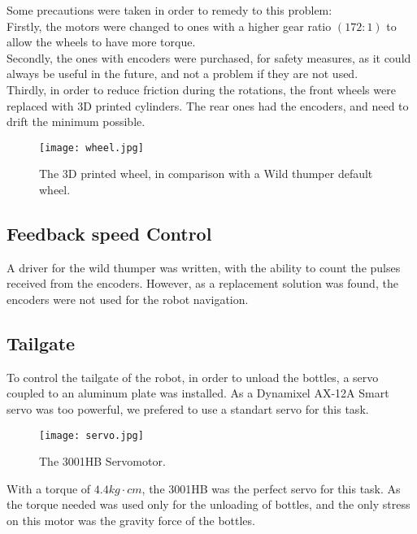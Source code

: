 Some precautions were taken in order to remedy to this problem:\\

Firstly, the motors were changed to ones with a higher gear ratio $(172:1)$ to allow the wheels to have more torque.\\

Secondly, the ones with encoders were purchased, for safety measures, as it could always be useful in the future, and not a problem if they are not used. \\

Thirdly, in order to reduce friction during the rotations, the front wheels were replaced with 3D printed cylinders. The rear ones had the encoders, and need to drift the minimum possible. \\

\begin{figure}[H]
  \centering
  \texttt{[image: wheel.jpg]}
  \caption{The 3D printed wheel, in comparison with a Wild thumper default wheel.}
\label{fig:wheel}
\end{figure}

\subsection{Feedback speed Control}
A driver for the wild thumper was written, with the ability to count the pulses received from the encoders. However, as a replacement solution was found, the encoders were not used for the robot navigation.

\subsection{Tailgate}

To control the tailgate of the robot, in order to unload the bottles, a servo coupled to an aluminum plate was installed. 
As a Dynamixel AX-12A Smart servo was too powerful, we prefered to use a standart servo for this task.

\begin{figure}[H]
  \centering
  \texttt{[image: servo.jpg]}
  \caption{The 3001HB Servomotor.}
\label{fig:servo}
\end{figure}

With a torque of $4.4kg \cdot cm$, the 3001HB was the perfect servo for this task. As the torque needed was used only for the unloading of bottles, and the only stress on this motor was the gravity force of the bottles. 

